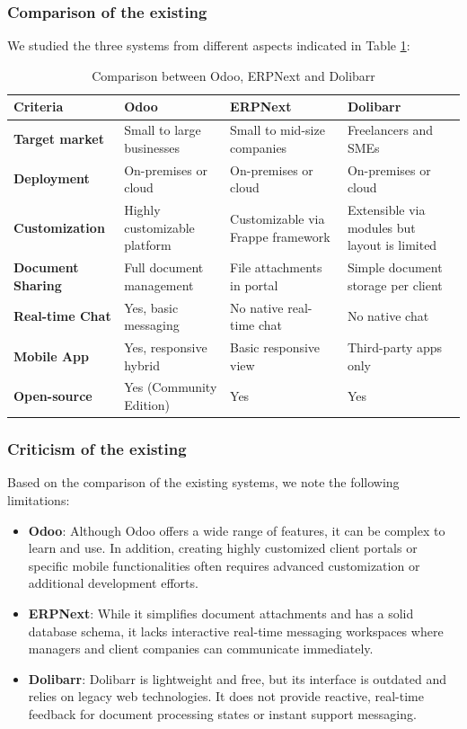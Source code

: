 \subsubsection{Comparison of the existing}
We studied the three systems from different aspects indicated in Table \ref{tab:comparison_existing}:
\begin{table}[H]
\centering
\caption{Comparison between Odoo, ERPNext and Dolibarr}
\label{tab:comparison_existing}
\begin{tabular}{|l|p{3.8cm}|p{3.8cm}|p{3.8cm}|}
\hline
\textbf{Criteria} & \textbf{Odoo} & \textbf{ERPNext} & \textbf{Dolibarr} \\
\hline
\textbf{Target market} & Small to large businesses & Small to mid-size companies & Freelancers and SMEs \\
\hline
\textbf{Deployment} & On-premises or cloud & On-premises or cloud & On-premises or cloud \\
\hline
\textbf{Customization} & Highly customizable platform & Customizable via Frappe framework & Extensible via modules but layout is limited \\
\hline
\textbf{Document Sharing} & Full document management & File attachments in portal & Simple document storage per client \\
\hline
\textbf{Real-time Chat} & Yes, basic messaging & No native real-time chat & No native chat \\
\hline
\textbf{Mobile App} & Yes, responsive hybrid & Basic responsive view & Third-party apps only \\
\hline
\textbf{Open-source} & Yes (Community Edition) & Yes & Yes \\
\hline
\end{tabular}
\end{table}

\subsubsection{Criticism of the existing}
Based on the comparison of the existing systems, we note the following limitations:
\begin{itemize}
    \item \textbf{Odoo}: Although Odoo offers a wide range of features, it can be complex to learn and use. In addition, creating highly customized client portals or specific mobile functionalities often requires advanced customization or additional development efforts.
    \item \textbf{ERPNext}: While it simplifies document attachments and has a solid database schema, it lacks interactive real-time messaging workspaces where managers and client companies can communicate immediately.
    \item \textbf{Dolibarr}: Dolibarr is lightweight and free, but its interface is outdated and relies on legacy web technologies. It does not provide reactive, real-time feedback for document processing states or instant support messaging.
\end{itemize}


